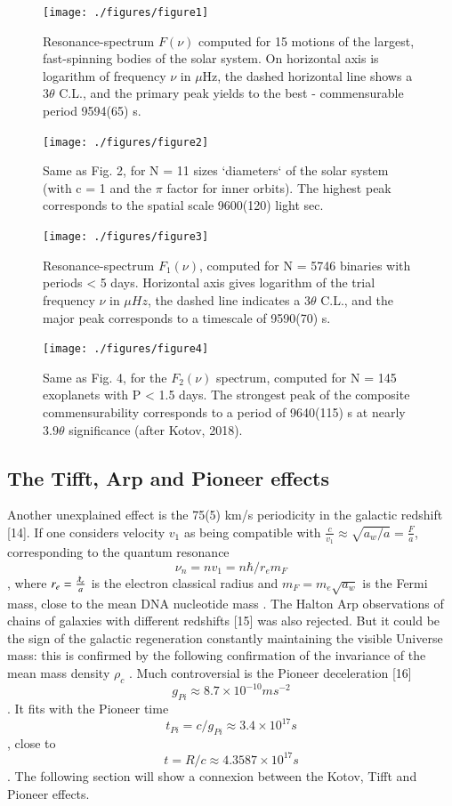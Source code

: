\documentclass[twoside,draft]{article}
\begin{document}
\begin{sloppypar}
{\begin{figure}
\centering
\texttt{[image: ./figures/figure1]}
\caption{Resonance-spectrum $F(\nu)$ computed for 15 motions of the largest, fast-spinning bodies of
the solar system. On horizontal axis is logarithm of frequency $\nu$ in $\mu$Hz, the dashed horizontal line
shows a $ 3 \theta $ C.L., and the primary peak yields to the best - commensurable period 9594(65) s.}
\label{fig:figure_label}
\end{figure}

\begin{figure}
\centering
\texttt{[image: ./figures/figure2]}
\caption{Same as Fig. 2, for N = 11 sizes `diameters` of the solar system (with c = 1 and the $\pi$
factor for inner orbits). The highest peak corresponds to the spatial scale 9600(120) light sec.}
\label{fig:figure_label}
\end{figure}

\begin{figure}
\centering
\texttt{[image: ./figures/figure3]}
\caption{Resonance-spectrum $F_{1} ( \nu)$, computed for N = 5746 binaries with periods < 5 days.
Horizontal axis gives logarithm of the trial frequency $\nu$ in $\mu Hz$, the dashed line indicates a $3 \theta$
C.L., and the major peak corresponds to a timescale of 9590(70) s.}
\label{fig:figure_label}
\end{figure}

\begin{figure}
\centering
\texttt{[image: ./figures/figure4]}
\caption{Same as Fig. 4, for the $F_{2} ( \nu )$ spectrum, computed for N = 145 exoplanets with P < 1.5
days. The strongest peak of the composite commensurability corresponds to a period of 9640(115) s
at nearly $3.9\theta$ significance (after Kotov, 2018).}
\label{fig:figure_label}
\end{figure}


\subsection{The Tifft, Arp and Pioneer effects}

Another unexplained effect is the 75(5) km/s periodicity in the galactic redshift [14]. If one considers
velocity $v_{1}$ as being compatible with $\frac{c}{v_{1}} \approx \sqrt{a_{w} /a} = \frac{F}{a}$, corresponding to the quantum resonance $$\nu_{n} = nv_{1} =n\hbar /r_{e} m_{F} $$, where $r_{e} = \frac{\lambdabar_{e}}{a}$ is the electron classical radius and $m_{F} = m_{e}\sqrt{a_{w}}$ is the Fermi mass, close to the mean DNA nucleotide mass \cite{fm1}.
The Halton Arp observations of chains of galaxies with different redshifts [15] was also
rejected. But it could be the sign of the galactic regeneration constantly maintaining the visible
Universe mass: this is confirmed by the following confirmation of the invariance of the mean mass
density $\rho_{c}$ .
Much controversial is the Pioneer deceleration [16] $$g_{Pi} \approx 8.7 \times 10^{-10} ms^{-2}$$. It fits with
the Pioneer time $$t_{Pi} = c/g_{Pi} \approx 3.4 \times 10^{17} s$$, close to $$t = R/c \approx 4.3587 \times 10^{17} s$$. The following section will show a connexion between the Kotov, Tifft and Pioneer effects.

}
\end{sloppypar}
\end{document}
